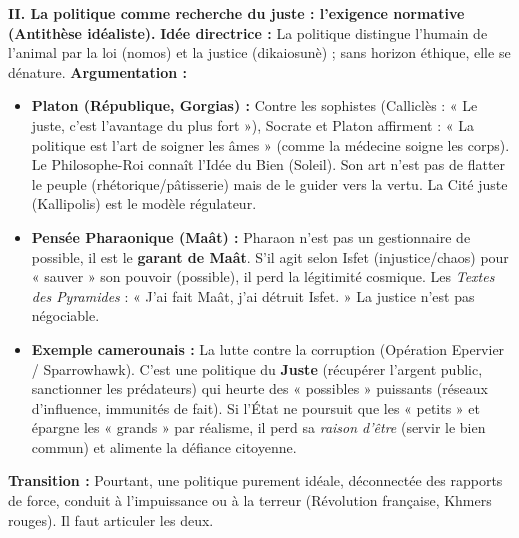 \documentclass[11pt]{article}
\newcommand{\cle}[1]{{\popxbold\color{popdark}#1}}
\begin{document}
\begin{exoresolu}
\textbf{II. La politique comme recherche du juste : l'exigence normative (Antithèse idéaliste).}
\textbf{Idée directrice :} La politique distingue l'humain de l'animal par la \cle{loi} (nomos) et la \cle{justice} (dikaiosunè) ; sans horizon éthique, elle se dénature.
\textbf{Argumentation :}
\begin{itemize}
    \item \textbf{Platon (République, Gorgias) :} Contre les sophistes (Calliclès : « Le juste, c'est l'avantage du plus fort »), Socrate et Platon affirment : « La politique est l'art de soigner les âmes » (comme la médecine soigne les corps). Le \cle{Philosophe-Roi} connaît l'\cle{Idée du Bien} (Soleil). Son art n'est pas de flatter le peuple (rhétorique/pâtisserie) mais de le guider vers la vertu. La Cité juste (Kallipolis) est le modèle régulateur.
    \item \textbf{Pensée Pharaonique (Maât) :} Pharaon n'est pas un gestionnaire de possible, il est le \textbf{garant de Maât}. S'il agit selon Isfet (injustice/chaos) pour « sauver » son pouvoir (possible), il perd la légitimité cosmique. Les \emph{Textes des Pyramides} : « J'ai fait Maât, j'ai détruit Isfet. » La justice n'est pas négociable.
    \item \textbf{Exemple camerounais :} La lutte contre la corruption (Opération \cle{Epervier} / \cle{Sparrowhawk}). C'est une politique du \textbf{Juste} (récupérer l'argent public, sanctionner les prédateurs) qui heurte des « possibles » puissants (réseaux d'influence, immunités de fait). Si l'État ne poursuit que les « petits » et épargne les « grands » par réalisme, il perd sa \emph{raison d'être} (servir le bien commun) et alimente la défiance citoyenne.
\end{itemize}
\textbf{Transition :} Pourtant, une politique purement idéale, déconnectée des rapports de force, conduit à l'impuissance ou à la terreur (Révolution française, Khmers rouges). Il faut articuler les deux.


\end{exoresolu}
\end{document}
